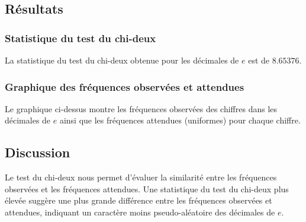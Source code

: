 \documentclass{article}
\begin{document}
\subsection{Résultats}

\subsubsection{Statistique du test du chi-deux}

La statistique du test du chi-deux obtenue pour les décimales de \(e\) est de \(8.65376\).

\subsubsection{Graphique des fréquences observées et attendues}

\begin{center}
\end{center}
    
Le graphique ci-dessus montre les fréquences observées des chiffres dans les décimales de \(e\) ainsi que les fréquences attendues (uniformes) pour chaque chiffre.

\subsection{Discussion}

Le test du chi-deux nous permet d'évaluer la similarité entre les fréquences observées et les fréquences attendues. Une statistique du test du chi-deux plus élevée suggère une plus grande différence entre les fréquences observées et attendues, indiquant un caractère moins pseudo-aléatoire des décimales de \(e\).
\end{document}

